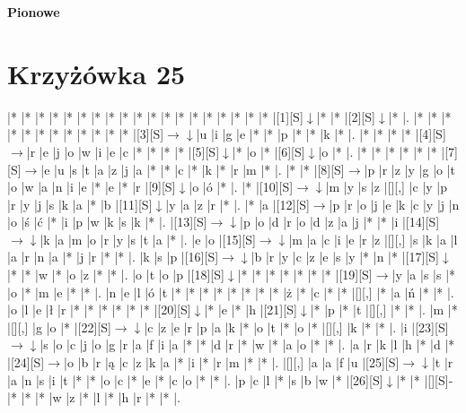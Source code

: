 \documentclass[11pt]{article}
\newcommand\drarr{$\rightarrow \!\!\!\!\! \downarrow$}
\newcommand\rarr{$\rightarrow$}
\newcommand\darr{$\downarrow$}
\begin{document}
\begin{PuzzleClues}{\textbf{Pionowe}\\}
\end{PuzzleClues}\newpage\section*{Krzyżówka 25}

\noindent\begin{Puzzle}{23}{28}|*	|*	|*	|*	|*	|*	|*	|*	|*	|*	|*	|*	|*	|*	|*	|*	|*	|*	|*	|[1][S]\darr	|*	|*	|[2][S]\darr	|*	|.
|*	|*	|*	|*	|*	|*	|*	|*	|*	|*	|*	|*	|[3][S]\drarr	|u	|i	|g	|e	|*	|*	|p	|*	|*	|k	|*	|.
|*	|*	|*	|*	|[4][S]\rarr	|r	|e	|j	|o	|w	|i	|e	|c	|*	|*	|*	|*	|[5][S]\darr	|*	|o	|*	|[6][S]\darr	|o	|*	|.
|*	|*	|*	|*	|*	|*	|[7][S]\rarr	|e	|u	|s	|t	|a	|z	|j	|a	|*	|*	|c	|*	|k	|*	|r	|m	|*	|.
|*	|*	|[8][S]\rarr	|p	|r	|z	|y	|g	|o	|t	|o	|w	|a	|n	|i	|e	|*	|e	|*	|r	|[9][S]\darr	|o	|ó	|*	|.
|*	|[10][S]\drarr	|m	|y	|s	|z	|[][,]{ }	|c	|y	|p	|r	|y	|j	|s	|k	|a	|*	|b	|[11][S]\darr	|y	|a	|z	|r	|*	|.
|*	|a	|[12][S]\rarr	|p	|r	|o	|j	|e	|k	|c	|y	|j	|n	|o	|ś	|ć	|*	|i	|p	|w	|k	|s	|k	|*	|.
|[13][S]\drarr	|p	|o	|d	|r	|o	|d	|z	|a	|j	|*	|*	|i	|[14][S]\drarr	|k	|a	|m	|o	|r	|y	|s	|t	|a	|*	|.
|e	|o	|[15][S]\drarr	|m	|a	|c	|i	|e	|r	|z	|[][,]{ }	|s	|k	|a	|l	|a	|r	|n	|a	|*	|j	|r	|*	|*	|.
|k	|s	|p	|[16][S]\drarr	|b	|r	|y	|c	|z	|e	|s	|y	|*	|n	|*	|[17][S]\darr	|*	|*	|w	|*	|o	|z	|*	|*	|.
|o	|t	|o	|p	|[18][S]\darr	|*	|*	|*	|*	|*	|*	|*	|[19][S]\rarr	|y	|a	|s	|s	|*	|o	|*	|m	|e	|*	|*	|.
|n	|e	|l	|ó	|t	|*	|*	|*	|*	|*	|*	|*	|*	|ż	|*	|c	|*	|*	|[][,]{ }	|*	|a	|ń	|*	|*	|.
|o	|l	|e	|ł	|r	|*	|*	|*	|*	|*	|*	|[20][S]\darr	|*	|e	|*	|h	|[21][S]\darr	|*	|p	|*	|t	|[][,]{ }	|*	|*	|.
|m	|*	|[][,]{ }	|g	|o	|*	|[22][S]\drarr	|c	|z	|e	|r	|p	|a	|k	|*	|o	|t	|*	|o	|*	|[][,]{ }	|k	|*	|*	|.
|i	|[23][S]\drarr	|s	|o	|c	|j	|o	|g	|r	|a	|f	|i	|a	|*	|*	|d	|r	|*	|w	|*	|a	|o	|*	|*	|.
|a	|r	|k	|l	|h	|*	|d	|*	|[24][S]\rarr	|o	|b	|r	|ą	|c	|z	|k	|a	|*	|i	|*	|r	|m	|*	|*	|.
|[][,]{ }	|a	|a	|f	|u	|[25][S]\drarr	|t	|r	|a	|n	|s	|i	|t	|*	|*	|o	|c	|*	|e	|*	|c	|o	|*	|*	|.
|p	|c	|l	|*	|s	|b	|w	|*	|[26][S]\darr	|*	|*	|[][S]-	|*	|*	|*	|w	|z	|*	|l	|*	|h	|r	|*	|*	|.

\end{Puzzle}
\end{document}
